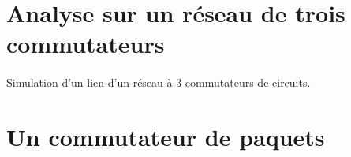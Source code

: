     \section{Analyse sur un réseau de trois commutateurs}
%
        \paragraph{}
Simulation d'un lien d'un réseau à 3 commutateurs de circuits.

    \clearpage
%
    \clearpage
%
    \clearpage
%
%
%
    \section{Un commutateur de paquets}
%
    \clearpage
%
    \clearpage
%
    \clearpage
%

